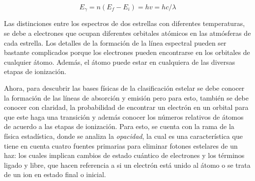 \documentclass[12pt,oneside,openany,letter]{book}
\begin{document}
\begin{equation}
    E_{\gamma} = n(E_f - E_i) = h v = hc/\lambda
    \label{eq:energia_foton}
\end{equation}


\noindent Las distinciones entre los espectros de dos estrellas con diferentes temperaturas, se debe a electrones que ocupan diferentes orbitales atómicos en las atmósferas de cada estrella. Los detalles de la formación de la línea espectral pueden ser bastante complicados porque los electrones pueden encontrarse en los orbitales de cualquier átomo. Además, el átomo puede estar en cualquiera de las diversas etapas de ionización.

\noindent Ahora, para descubrir las bases físicas de la clasificación estelar se debe conocer la formación de las líneas de absorción y emisión pero para esto, también se debe conocer con claridad, la probabilidad de encontrar un electrón en un orbital para que este haga una transición y además conocer los números relativos de átomos de acuerdo a las etapas de ionización. Para esto, se cuenta con la rama de la física estadística, donde se analiza la \textit{opacidad}, la cual es una característica que tiene en cuenta cuatro fuentes primarias para eliminar fotones estelares de un haz: los cuales implican cambios de estado cuántico de electrones y los términos ligado y libre, que hacen referencia a si un electrón está unido al átomo o se trata de un ion en estado final o inicial.
\end{document}
